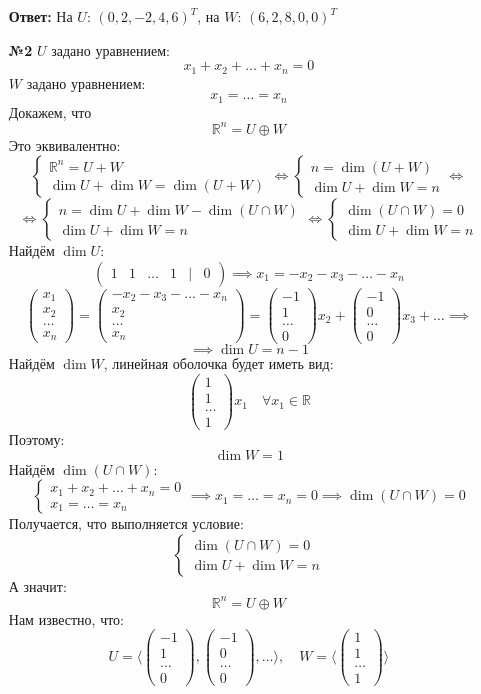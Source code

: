 \documentclass[a4paper]{article}
\newcommand{\mat}[1]{\begin{pmatrix} #1 \end{pmatrix}}
\newcommand{\case}[1]{\begin{cases} #1 \end{cases}}
\newcommand{\lr}{\Leftrightarrow}
\newcommand{\RR}{\mathbb{R}}
\begin{document}
\begin{enumerate}
    \textbf{Ответ: } На $U$: $(0, 2, -2, 4, 6)^T$, на $W$: $(6, 2, 8, 0, 0)^T$\\

    \item[\textbf{№2}] $U$ задано уравнением:
    $$x_1 + x_2 + \dots + x_n = 0$$
    $W$ задано уравнением:
    $$x_1 = \dots = x_n $$
    Докажем, что 
    $$\RR^n = U \oplus W$$
    Это эквивалентно:
    $$\case{
        \RR^n = U+W\\
        \dim U + \dim W = \dim(U + W)
    } \lr \case{
        n = \dim(U+W)\\
        \dim U + \dim W = n
    } \lr$$
    $$ \lr \case{
        n = \dim U + \dim W - \dim(U \cap W)\\
        \dim U + \dim W = n
    } \lr \case{
        \dim(U \cap W) = 0 \\
        \dim U + \dim W = n
    }$$
    Найдём $\dim U$:
    $$\mat{1 & 1 & \dots & 1 & | & 0} \implies x_1 = -x_2-x_3-\dots-x_n$$
    $$\mat{x_1 \\ x_2 \\ \dots \\ x_n} = \mat{-x_2-x_3-\dots-x_n\\x_2 \\ \dots \\ x_n} = \mat{-1\\1 \\ \dots \\ 0}x_2 + \mat{-1\\0 \\ \dots \\ 0}x_3 + \dots \implies$$
    $$\implies \dim U = n-1$$
    Найдём $\dim W$, линейная оболочка будет иметь вид:
    $$\mat{1\\1\\\dots\\1}x_1 \quad \forall x_1 \in \RR$$
    Поэтому:
    $$\dim W = 1$$
    Найдём $\dim( U \cap W)$:
    $$\case{
        x_1 + x_2 + \dots + x_n = 0\\
        x_1 = \dots = x_n 
    } \implies x_1 = \dots = x_n = 0 \implies \dim (U \cap W )= 0$$
    Получается, что выполняется условие:
    $$\case{
        \dim(U \cap W) = 0 \\
        \dim U + \dim W = n
    }$$
    А значит:
    $$\RR^n = U \oplus W$$
    Нам известно, что:
    $$U = \langle \mat{-1\\1 \\ \dots \\ 0},\mat{-1\\0 \\ \dots \\ 0}, \dots\rangle, \quad W = \langle \mat{1\\1\\\dots\\1} \rangle$$

\end{enumerate}
\end{document}
